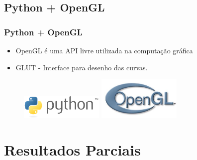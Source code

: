 \documentclass{beamer}
\begin{document}
\subsection{Python + OpenGL}
\begin{frame}
\frametitle{Python + OpenGL}
\begin{itemize}
	\item OpenGL é uma API livre utilizada na computação gráfica
	\item GLUT - Interface para desenho das curvas. 
\end{itemize}

\begin{figure}[h]	
\centering
\includegraphics[width=4cm]{Python}
\qquad
\includegraphics[width=4cm]{logoopengl}
\end{figure}

\end{frame}    

\section{Resultados Parciais}
\begin{frame}
\tableofcontents[ 
    currentsubsection, 
    hideothersubsections, 
    sectionstyle=show/shaded
    ] 
\end{frame}
\end{document}
